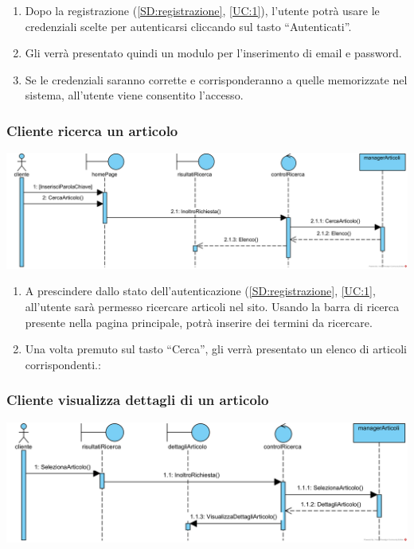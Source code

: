 \documentclass[12pt,a4paper]{article}
\begin{document}
\begin{enumerate}
\item Dopo la registrazione (\ref{SD:registrazione}, \ref{UC:1}), l'utente potrà usare le credenziali scelte per autenticarsi cliccando sul tasto ``Autenticati''.
\item Gli verrà presentato quindi un modulo per l'inserimento di email e password.
\item Se le credenziali saranno corrette e corrisponderanno a quelle memorizzate nel sistema, all'utente viene consentito l'accesso.
\end{enumerate}

\subsubsection{Cliente ricerca un articolo}
\label{SD:ricerca}

\begin{center}
\includegraphics[width=\textwidth]{SequenceDiagram/ClienteCercaArticolo}
\end{center}

\begin{enumerate}
\item A prescindere dallo stato dell'autenticazione (\ref{SD:registrazione}, \ref{UC:1}, all'utente sarà permesso ricercare articoli nel sito. Usando la barra di ricerca presente nella pagina principale, potrà inserire dei termini da ricercare.
\item Una volta premuto sul tasto ``Cerca'', gli verrà presentato un elenco di articoli corrispondenti.:
\end{enumerate}

\subsubsection{Cliente visualizza dettagli di un articolo}
\label{SD:dettagli}

\begin{center}
\includegraphics[width=\textwidth]{SequenceDiagram/ClienteSelezionaArticolo}
\end{center}
\end{document}
